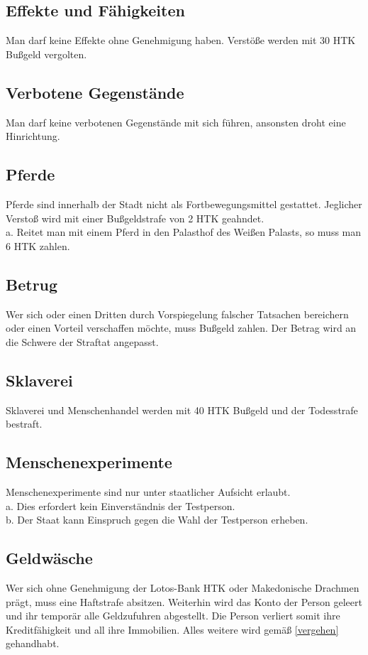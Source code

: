 \documentclass{article}
\begin{document}
\subsection{Effekte und Fähigkeiten}
Man darf keine Effekte ohne Genehmigung haben. Verstöße werden mit 30 HTK Bußgeld vergolten.

\subsection{Verbotene Gegenstände}
Man darf keine verbotenen Gegenstände mit sich führen, ansonsten droht eine Hinrichtung.

\subsection{Pferde}
Pferde sind innerhalb der Stadt nicht als Fortbewegungsmittel gestattet. Jeglicher Verstoß wird mit einer Bußgeldstrafe von 2 HTK geahndet.\\
a. Reitet man mit einem Pferd in den Palasthof des Weißen Palasts, so muss man 6 HTK zahlen.

\subsection{Betrug}
Wer sich oder einen Dritten durch Vorspiegelung falscher Tatsachen bereichern oder einen Vorteil verschaffen möchte, muss Bußgeld zahlen. Der Betrag wird an die Schwere der Straftat angepasst.

\subsection{Sklaverei}
Sklaverei und Menschenhandel werden mit 40 HTK Bußgeld und der Todesstrafe bestraft.

\subsection{Menschenexperimente}
Menschenexperimente sind nur unter staatlicher Aufsicht erlaubt.\\
a. Dies erfordert kein Einverständnis der Testperson.\\
b. Der Staat kann Einspruch gegen die Wahl der Testperson erheben.

\subsection{Geldwäsche}
Wer sich ohne Genehmigung der Lotos-Bank HTK oder Makedonische Drachmen prägt, muss eine Haftstrafe absitzen. Weiterhin wird das Konto der Person geleert und ihr temporär alle Geldzufuhren abgestellt. Die Person verliert somit ihre Kreditfähigkeit und all ihre Immobilien. Alles weitere wird gemäß \ref{vergehen} gehandhabt.
\end{document}

